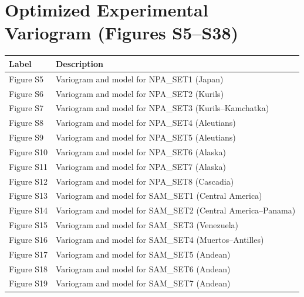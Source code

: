 \documentclass[final]{agujournal2019}
\newcounter{none}
\begin{document}
\clearpage

\section*{Optimized Experimental Variogram (Figures
S5--S38)}\label{sec:optimized-experimental-variogram}

{\def\LTcaptype{none} %
\begin{longtable}[]{@{}
  >{\raggedright\arraybackslash}p{}
  >{\raggedright\arraybackslash}p{}@{}}
\toprule\noalign{}
\begin{minipage}[b]{\linewidth}\raggedright
Label
\end{minipage} & \begin{minipage}[b]{\linewidth}\raggedright
Description
\end{minipage} \\
\midrule\noalign{}
\endhead
\bottomrule\noalign{}
\endlastfoot
Figure S5 & Variogram and model for NPA\_SET1 (Japan) \\
Figure S6 & Variogram and model for NPA\_SET2 (Kurils) \\
Figure S7 & Variogram and model for NPA\_SET3 (Kurils--Kamchatka) \\
Figure S8 & Variogram and model for NPA\_SET4 (Aleutians) \\
Figure S9 & Variogram and model for NPA\_SET5 (Aleutians) \\
Figure S10 & Variogram and model for NPA\_SET6 (Alaska) \\
Figure S11 & Variogram and model for NPA\_SET7 (Alaska) \\
Figure S12 & Variogram and model for NPA\_SET8 (Cascadia) \\
Figure S13 & Variogram and model for SAM\_SET1 (Central America) \\
Figure S14 & Variogram and model for SAM\_SET2 (Central
America--Panama) \\
Figure S15 & Variogram and model for SAM\_SET3 (Venezuela) \\
Figure S16 & Variogram and model for SAM\_SET4 (Muertos--Antilles) \\
Figure S17 & Variogram and model for SAM\_SET5 (Andean) \\
Figure S18 & Variogram and model for SAM\_SET6 (Andean) \\
Figure S19 & Variogram and model for SAM\_SET7 (Andean) \\

\end{longtable}}
\end{document}
